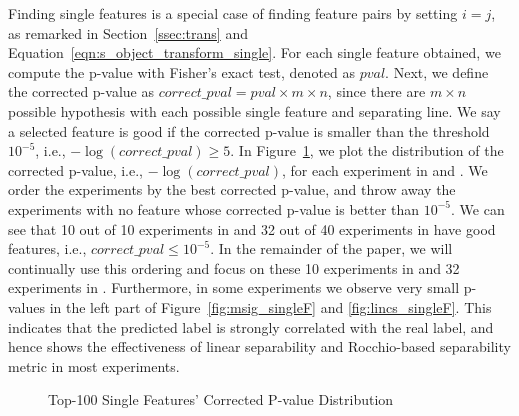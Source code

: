 Finding \topk single features is a special case of finding feature pairs by setting $i=j$, as remarked in Section~\ref{ssec:trans} and Equation~\ref{eqn:s_object_transform_single}. For each single feature obtained, we compute the p-value with Fisher's exact test, denoted as $pval$. Next, we define the corrected p-value as $correct\_pval= pval\times m \times n$, since there are $m \times n$ possible hypothesis with each possible single feature and separating line. We say a selected feature is good if the corrected p-value is smaller than the threshold $10^{-5}$, i.e., $-\log (correct\_pval)\geq5$. In Figure~\ref{fig:singleF}, we plot the distribution of the corrected p-value, i.e., $-\log (correct\_pval)$, for each experiment in \msig and \lincs. We order the experiments by the best corrected p-value, and throw away the experiments with no feature whose corrected p-value is better than $10^{-5}$. We can see that 10 out of 10 experiments in \msig and 32 out of 40 experiments in \lincs have good features, i.e., $correct\_pval \leq 10^{-5}$. In the remainder of the paper, we will continually use this ordering and focus on these 10 experiments in \msig and 32 experiments in \lincs. Furthermore, in some experiments we observe very small p-values in the left part of Figure~\ref{fig:msig_singleF} and \ref{fig:lincs_singleF}. This indicates that the predicted label is strongly correlated with the real label, and hence shows the effectiveness of linear separability and Rocchio-based separability metric in most experiments.


\begin{figure}[h]
\centering     %
\vspace{-5mm}
\vspace{-5mm}
\caption{Top-100 Single Features' Corrected P-value Distribution}
\vspace{-5mm}
\label{fig:singleF}
\end{figure}

